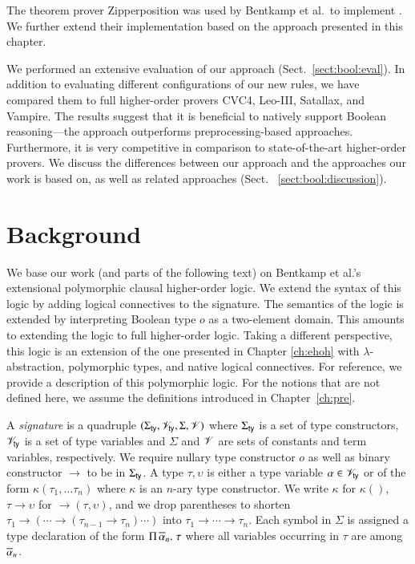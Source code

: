 The theorem prover Zipperposition \cite{sc-15-simon-phd,sc-supind-17} was used
by Bentkamp et al.\ to implement \lsup{}. We further extend their implementation
based on the approach presented in this chapter.

We performed an extensive evaluation of our approach (Sect.~\ref{sect:bool:eval}).
In addition to evaluating different configurations of our new rules, we have
compared them to full higher-order provers CVC4, Leo-III,  Satallax, and Vampire.
The results suggest that it is beneficial to natively support Boolean reasoning---the approach outperforms preprocessing-based approaches. Furthermore, it is
very competitive in comparison to state-of-the-art higher-order provers. We discuss the differences between our approach and the
approaches our work is based on, as well as related approaches (Sect.~
\ref{sect:bool:discussion}).


\section{Background} 
\label{sect:bool:background}

We base our work (and parts of the following text) on Bentkamp et al.'s
\cite{bbtvw-21-sup-lam} extensional polymorphic clausal higher-order logic. We
extend the syntax of this logic by adding logical connectives to the signature.
The semantics of the logic is extended by interpreting Boolean type $o$ as a
two-element domain. This amounts to extending the logic to full higher-order
logic. Taking a different perspective, this logic is an extension of the one
presented in Chapter \ref{ch:ehoh} with $\lambda$-abstraction, polymorphic
types, and native logical connectives. For reference, we provide a
description of this polymorphic logic. For the notions that are not defined here,
we assume the definitions introduced in Chapter~\ref{ch:pre}.

A {\em signature} is a quadruple $(\Sigma_\mathsf{ty}, \mathscr{V}_\mathsf{ty}, \Sigma, \mathscr{V})$ where $\Sigma_\mathsf{ty}$ is a
set of type constructors, $\mathscr{V}_\mathsf{ty}$ is a set of type variables and $\Sigma$ and
$\mathscr{V}$ are sets of constants and term variables, respectively. We require nullary
type constructor $o$ as well as binary constructor $\rightarrow$
to be in $\Sigma_\mathsf{ty}$. A type $\tau, \upsilon$ is either a type variable $\alpha \in
\mathscr{V}_\mathsf{ty}$ or of the form $\kappa(\tau_1, \ldots \tau_n)$ where $\kappa$ is an
$n$-ary type constructor. We write $\kappa$ for $\kappa()$, $\tau \rightarrow
\upsilon$ for $\rightarrow(\tau, \upsilon)$, and we drop parentheses to shorten 
$\tau_1 \rightarrow (\cdots \rightarrow (\tau_{n-1} \rightarrow \tau_n) \cdots)$ into $\tau_1 \rightarrow \cdots \rightarrow
\tau_n$. Each symbol in $\Sigma$ is
assigned a type declaration of the form $\Pi\,\overline{\alpha}_{n}.\; \tau$ where all variables
occurring in $\tau$ are among $\overline{\alpha}_{n}$.

